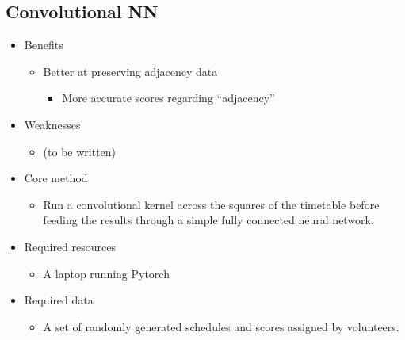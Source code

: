 \documentclass{article}
\begin{document}
\subsection{Convolutional NN}
\begin{itemize}
  \item Benefits
    \begin{itemize}
      \item Better at preserving adjacency data
        \begin{itemize}
          \item More accurate scores regarding “adjacency”
        \end{itemize}
    \end{itemize}
  \item Weaknesses
    \begin{itemize}
      \item (to be written)
    \end{itemize}
  \item Core method
    \begin{itemize}
      \item Run a convolutional kernel across the squares of the timetable before feeding the results through a simple fully connected neural network.
    \end{itemize}
  \item Required resources
    \begin{itemize}
      \item A laptop running Pytorch
    \end{itemize}
  \item Required data
    \begin{itemize}
      \item A set of randomly generated schedules and scores assigned by volunteers.
    \end{itemize}
\end{itemize}
\end{document}
